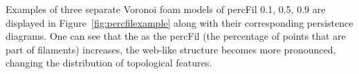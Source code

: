 \documentclass[12pt]{article}
\newcommand{\figref}[1]{Figure~\ref{#1}}
\begin{document}


Examples of three separate Voronoi foam models of percFil 0.1, 0.5, 0.9 are displayed in \figref{fig:percfilexample} along with their corresponding persistence diagrams. One can see that the as the percFil (the percentage of points that are part of filaments) increases, the web-like structure becomes more pronounced, changing the distribution of topological features.
\end{document}
